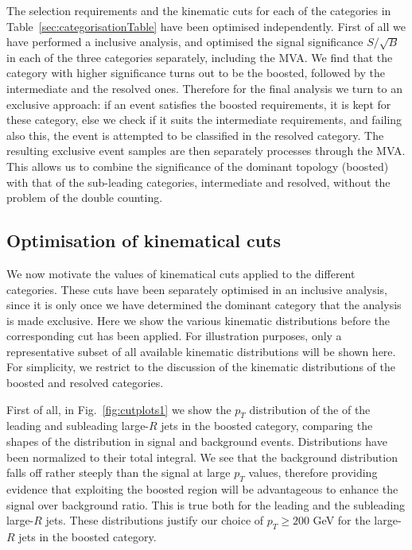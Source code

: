 The selection requirements and the kinematic cuts
for each of the categories in Table~\ref{sec:categorisationTable} have
been optimised independently.
%
First of all we have performed a inclusive analysis, and optimised the
signal significance
$S/\sqrt{B}$ in each of the three categories separately, including
the MVA.
%
We find that the category with higher significance turns out to be the boosted,
followed by the intermediate and the resolved ones.
%
Therefore for the final analysis we turn to an exclusive approach:
if an event satisfies the boosted requirements, it is kept for
these category, else we check if it suits the intermediate
requirements, and failing also this, the event is attempted to
be classified in the
resolved category.
%
The resulting exclusive event samples are then separately processes
through the MVA.
%
This allows us to combine the significance of the dominant topology
(boosted) with that of the sub-leading categories, intermediate
and resolved, without the problem of the double counting.

\subsection{Optimisation of kinematical cuts}

We now motivate the values of
kinematical cuts applied to the different categories.
%
These cuts have been separately
optimised in an inclusive analysis, since it is only
once we have determined
the dominant category that the analysis is made exclusive.
%
Here we show the various kinematic distributions 
before the corresponding cut has been applied.
%
For illustration purposes,
only a representative subset of
all available kinematic distributions will be shown here.
%
For simplicity,
we restrict to the discussion of the
kinematic distributions of the boosted
and resolved categories.


First of all,
in Fig.~\ref{fig:cutplots1} we show
the $p_T$ distribution of the 
of the
  leading and subleading large-$R$ jets in the boosted category, comparing
  the shapes of the distribution in signal and background events.
  Distributions have been normalized to their total integral.
  We see that the background distribution
  falls off rather steeply than the signal at large $p_T$
  values, therefore
  providing evidence that exploiting the boosted region will be
  advantageous to enhance the signal over background ratio.
  This is true both for the leading and the subleading
  large-$R$ jets.
  These distributions justify our choice of $p_T \ge 200$ GeV
  for the large-$R$ jets in the boosted category.
  

